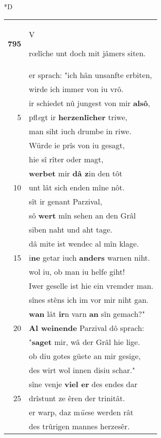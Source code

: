 \documentclass[8pt,a4paper,notitlepage]{article}
\begin{document}
\begin{table}[ht]
\begin{minipage}[t]{0.5\linewidth}
\small
\begin{center}*D
\end{center}
\begin{tabular}{rl}
\textbf{795} & \begin{large}V\end{large}rœlîche unt doch mit jâmers siten.\\ 
 & er sprach: "ich hân unsanfte erbiten,\\ 
 & wirde ich immer von iu vrô.\\ 
 & ir schiedet nû jungest von mir \textbf{alsô},\\ 
5 & pfl\textit{e}gt ir \textbf{herzenlîcher} triwe,\\ 
 & man siht iuch drumbe in riwe.\\ 
 & Würde ie prîs von iu gesagt,\\ 
 & hie sî rîter oder magt,\\ 
 & \textbf{werbet} mir \textbf{dâ z}in den tôt\\ 
10 & unt lât sich enden mîne nôt.\\ 
 & sît ir genant Parzival,\\ 
 & sô \textbf{wert} mîn sehen an den Grâl\\ 
 & siben naht und aht tage.\\ 
 & dâ mite ist wendec al mîn klage.\\ 
15 & i\textbf{ne} getar iuch \textbf{anders} warnen niht.\\ 
 & wol iu, ob man iu helfe giht!\\ 
 & Iwer geselle ist hie ein vremder man.\\ 
 & sînes stêns ich im vor mir niht gan.\\ 
 & \textbf{wan} lât \textbf{ir}n varn \textbf{an} sîn gemach?"\\ 
20 & \textbf{Al weinende} Parzival dô sprach:\\ 
 & "\textbf{saget} mir, wâ der Grâl hie lige.\\ 
 & ob diu gotes güete an mir gesige,\\ 
 & des wirt wol innen disiu schar."\\ 
 & sîne venje \textbf{viel er} des endes dar\\ 
25 & drîstunt ze êren der trinitât.\\ 
 & er warp, daz m\textit{üe}se werden rât\\ 
 & des trûrigen mannes herzesêr.\\ 

\end{tabular}
\end{minipage}
\end{table}
\end{document}
